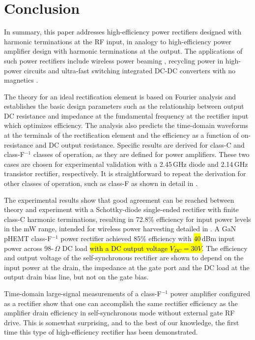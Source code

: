 \documentclass[journal]{IEEEtran}
\begin{document}
\section{Conclusion}
In summary, this paper addresses high-efficiency power rectifiers designed with harmonic terminations at the RF input, in analogy to high-efficiency power amplifier design with harmonic terminations at the output. The applications of such power rectifiers include wireless power beaming \cite{brown_rect2}, recycling power in high-power circuits \cite{asbeck} and ultra-fast switching integrated DC-DC converters with no magnetics \cite{4500dcdc}.

The theory for an ideal rectification element is based on Fourier analysis and establishes the basic design parameters such as the relationship between output DC resistance and impedance at the fundamental frequency at the rectifier input which optimizes efficiency. The analysis also predicts the time-domain waveforms at the terminals of the rectification element and the efficiency as a function of on-resistance and DC output resistance. Specific results are derived for class-C and class-F$^{-1}$ classes of operation, as they are defined for power amplifiers. These two cases are chosen for experimental validation with a 2.45\,GHz diode and 2.14\,GHz transistor rectifier, respectively. It is straightforward to repeat the derivation for other classes of operation, such as class-F as shown in detail in \cite{roberg_phd}.

The experimental results show that good agreement can be reached between theory and experiment with a Schottky-diode single-ended rectifier with finite class-C harmonic terminations, resulting in 72.8\% efficiency for input power levels in the mW range, intended for wireless power harvesting detailed in \cite{robergIMS2012,erezMTT2012}. A GaN pHEMT class-F$^{-1}$ power rectifier achieved 85\% efficiency with \hl{40}\,dBm input power across 98-\,$\Omega$ DC load \hl{with a DC output voltage $V_{DC}=30V$}. The efficiency and output voltage of the self-synchronous rectifier are shown to depend on the input power at the drain, the impedance at the gate port and the DC load at the output drain bias line, but not on the gate bias.

Time-domain large-signal measurements of a class-F$^{-1}$ power amplifier configured as a rectifier show that one can accomplish the same rectifier efficiency as the amplifier drain efficiency in self-synchronous mode without external gate RF drive. This is somewhat surprising, and to the best of our knowledge, the first time this type of high-efficiency rectifier has been demonstrated.
\end{document}
